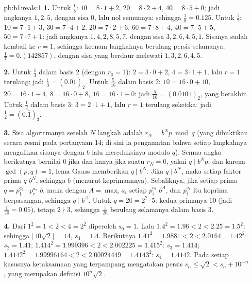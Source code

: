 \begin{solution}{pb:b1:reals:1}
\textbf{1.} Untuk $\frac 18$: $10 = 8 \cdot 1 + 2$, $20 = 8 \cdot 2
+ 4$, $40 = 8 \cdot 5 + 0$; jadi angkanya $1, 2, 5$, dengan sisa $0$, lalu
nol semuanya: sehingga $\frac 18 = 0.125$. Untuk $\frac 17$: $10 = 7 \cdot 1 +
3$, $30 = 7 \cdot 4 + 2$, $20 = 7 \cdot 2 + 6$, $60 = 7 \cdot 8 +
4$, $40 = 7 \cdot 5 + 5$, $50 = 7 \cdot 7 + 1$: jadi angkanya $1, 4, 2,
8, 5, 7$, dengan sisa $3, 2, 6, 4, 5, 1$. Sisanya sudah
kembali ke $r = 1$, sehingga keenam langkahnya berulang persis selamanya:
$\frac 17 = 0.(142857)$, dengan sisa yang berdaur melewati $1, 3, 2, 6,
4, 5$.

\textbf{2.} Untuk $\frac 13$ dalam basis $2$ (dengan $r_0 = 1$): $2 = 3 \cdot 0 +
2$, $4 = 3 \cdot 1 + 1$, lalu $r = 1$ terulang: jadi $\frac 13 =
(0.\overline{01})_2$. Untuk $\frac{5}{16}$ dalam basis $2$: $10 = 16 \cdot
0 + 10$, $20 = 16 \cdot 1 + 4$, $8 = 16 \cdot 0 + 8$, $16 = 16
\cdot 1 + 0$: jadi $\frac{5}{16} = (0.0101)_2$, yang berakhir. Untuk $\frac 12$
dalam basis $3$: $3 = 2 \cdot 1 + 1$, lalu $r = 1$ terulang seketika:
jadi $\frac 12 = (0.\overline{1})_3$.

\textbf{3.} Sisa algoritmanya setelah $N$ langkah adalah $r_N =
b^N p \bmod q$ (yang dibuktikan secara resmi pada pertanyaan 14; di sini ia
pengamatan bahwa setiap langkahnya mengalikan sisanya dengan $b$ lalu
mereduksinya modulo $q$). Semua angka berikutnya bernilai $0$ jika dan hanya jika suatu
$r_N = 0$, yakni $q \mid b^N p$; dan karena $\gcd(p, q) = 1$, lema
Gauss memberikan $q \mid b^N$. Jika $q \mid b^N$, maka setiap faktor prima
$q$  $b^N$, sehingga  $b$ (menurut keprimaannya). Sebaliknya, jika
setiap prima $q = p_1^{a_1} \cdots p_r^{a_r}$  $b$, maka
dengan $A = \max_i a_i$ setiap $p_i^{a_i}$  $b^A$, dan
$p_i^{a_i}$ itu koprima berpasangan, sehingga $q \mid b^A$. Untuk $q = 20 =
2^2 \cdot 5$: kedua primanya  $10$ (jadi $\frac{1}{20} = 0.05$),
tetapi $2 \nmid 3$, sehingga $\frac{1}{20}$ berulang selamanya dalam basis $3$.

\textbf{4.} Dari $1^2 = 1 < 2 < 4 = 2^2$ diperoleh $s_0 = 1$. Lalu $1.4^2
= 1.96 < 2 < 2.25 = 1.5^2$: sehingga $\lfloor 10\sqrt 2 \rfloor = 14$,
$s_1 = 1.4$. Berikutnya $1.41^2 = 1.9881 < 2 < 2.0164 = 1.42^2$: $s_2 =
1.41$; $1.414^2 = 1.999396 < 2 < 2.002225 = 1.415^2$: $s_3 =
1.414$; $1.4142^2 = 1.99996164 < 2 < 2.00024449 = 1.4143^2$: $s_4
= 1.4142$. Pada setiap kasusnya ketaksamaan yang terpampang mengatakan persis
$s_n \leq \sqrt 2 < s_n + 10^{-n}$, yang merupakan definisi
 $10^n \sqrt 2$.


\end{solution}
